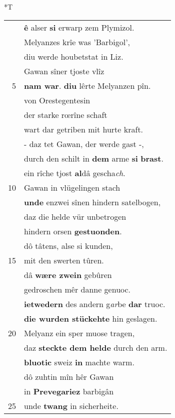 \documentclass[8pt,a4paper,notitlepage]{article}
\begin{document}
\begin{table}[ht]
\begin{minipage}[t]{0.5\linewidth}
\end{minipage}
\hspace{0.5cm}
\begin{minipage}[t]{0.5\linewidth}
\small
\begin{center}*T
\end{center}
\begin{tabular}{rl}
 & \textbf{ê} alser \textbf{si} erwarp zem Plymizol.\\ 
 & Melyanzes krîe was 'Barbigol',\\ 
 & diu werde houbetstat in Liz.\\ 
 & Gawan sîner tjoste vlîz\\ 
5 & \textbf{nam war}. \textbf{diu} lêrte Melyanzen pîn.\\ 
 & von Orestegentesin\\ 
 & der starke rœrîne schaft\\ 
 & wart dar getriben mit hurte kraft.\\ 
 & - daz tet Gawan, der werde gast -,\\ 
 & durch den schilt in \textbf{dem} arme \textbf{si} \textbf{brast}.\\ 
 & ein rîche tjost \textbf{al}dâ gescha\textit{ch}.\\ 
10 & Gawan in vlügelingen stach\\ 
 & \textbf{unde} enzwei sînen hindern satelbogen,\\ 
 & daz die helde vür unbetrogen\\ 
 & hindern orsen \textbf{gestuonden}.\\ 
 & dô tâtens, alse si kunden,\\ 
15 & mit den swerten tûren.\\ 
 & dâ \textbf{wære zwein} gebûren\\ 
 & gedroschen mêr danne genuoc.\\ 
 & \textbf{ietwedern} des andern g\textit{ar}be \textbf{dar} truoc.\\ 
 & \textbf{die wurden stückehte} hin geslagen.\\ 
20 & Melyanz ein sper muose tragen,\\ 
 & daz \textbf{steckte dem helde} durch den arm.\\ 
 & \textbf{bluotic} sweiz \textbf{in} machte warm.\\ 
 & dô zuhtin mîn hêr Gawan\\ 
 & in \textbf{Prevegariez} barbigân\\ 
25 & unde \textbf{twang} in sicherheite.\\ 

\end{tabular}
\end{minipage}
\end{table}
\end{document}
